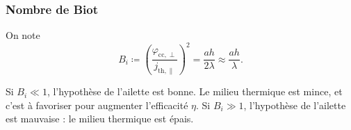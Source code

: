         \subsubsection{Nombre de Biot}

            On note
            \begin{equation*}
                \boxed{
                    B_i\coloneqq\left(\frac{\varphi_{\text{cc},\perp}}{j_{\text{th},\parallel}}\right)^{2}=\frac{ah}{2\lambda}\approx\frac{ah}{\lambda}.
                }
            \end{equation*}

            Si $B_i\ll1$, l'hypothèse de l'ailette est bonne. Le milieu thermique est mince, et c'est à favoriser pour augmenter l'efficacité $\eta$.
            Si $B_i\gg1$, l'hypothèse de l'ailette est mauvaise : le milieu thermique est épais.